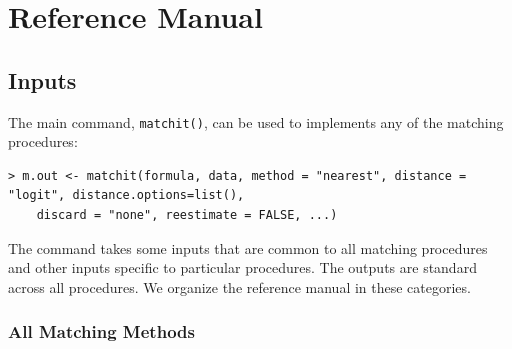 \documentclass[oneside,letterpaper,titlepage]{article}
\begin{document}



\section{Reference Manual}
\label{sec:reference}

\subsection{Inputs}
\label{subsec:inputs}

The main command, \texttt{matchit()}, can be used to implements any of
the matching procedures:
\begin{verbatim}
> m.out <- matchit(formula, data, method = "nearest", distance = "logit", distance.options=list(), 
	discard = "none", reestimate = FALSE, ...)
\end{verbatim}
The command takes some inputs that are common to all matching
procedures and other inputs specific to particular procedures.  The
outputs are standard across all procedures.  We organize the reference
manual in these categories.

\subsubsection{All Matching Methods}
\label{subsubsec:inputs-all}
\end{document}
